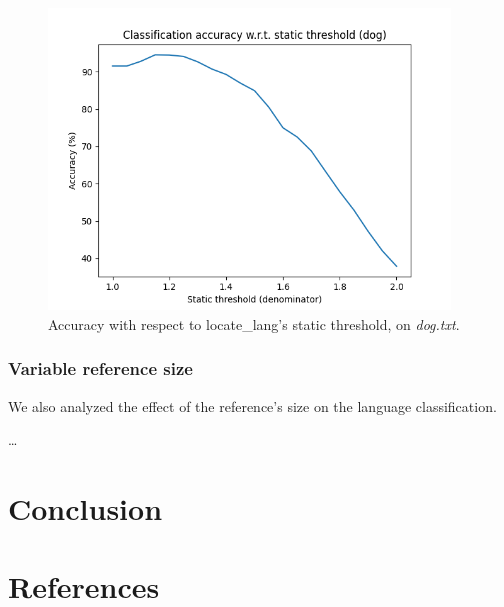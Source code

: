 \documentclass{article}
\begin{document}
\begin{figure}
    \centering
    \includegraphics[width=0.95\textwidth]{../results/ll_dog/ll-s.png}
    \caption{Accuracy with respect to locate_lang's static threshold, on \textit{dog.txt}.}
    \label{fig:ll_s_dog}
\end{figure}

\subsubsection{Variable reference size}

We also analyzed the effect of the reference's size on the language classification.

\dots

\section{Conclusion}
\label{sec:conclusion}

\section{References}


\end{document}
